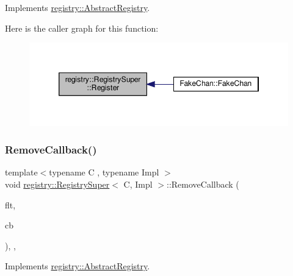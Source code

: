 Implements \hyperlink{classregistry_1_1AbstractRegistry_a5deafe61aa33b1be6b261d815e7397a1}{registry\+::\+Abstract\+Registry}.

Here is the caller graph for this function\+:
\nopagebreak
\begin{figure}[H]
\begin{center}
\leavevmode
\includegraphics[width=346pt]{classregistry_1_1RegistrySuper_a6293786807c1d9cc1f72a60c8c218b6f_icgraph}
\end{center}
\end{figure}
\mbox{\label{classregistry_1_1RegistrySuper_a61948ba29418a844f1b2c9b1259e26bf}} 
\subsubsection{\texorpdfstring{Remove\+Callback()}{RemoveCallback()}}
{\footnotesize\ttfamily template$<$typename C , typename Impl $>$ \\
void \hyperlink{classregistry_1_1RegistrySuper}{registry\+::\+Registry\+Super}$<$ C, Impl $>$\+::Remove\+Callback (\begin{DoxyParamCaption}\item[{\hyperlink{classregistry_1_1Filter}{Filter}}]{flt,  }\item[{\hyperlink{classregistry_1_1AbstractRegistry_a08a798ca9ca1c4c983ebd2386ca3c315}{Abstract\+Registry\+::\+Callback}}]{cb }\end{DoxyParamCaption})\hspace{0.3cm}{\ttfamily [override]}, {\ttfamily [virtual]}, {\ttfamily [noexcept]}}



Implements \hyperlink{classregistry_1_1AbstractRegistry_ae09a4b165d916b6c212988d882d1a33f}{registry\+::\+Abstract\+Registry}.

\mbox{\label{classregistry_1_1RegistrySuper_a3d35e055e1e69a00074701356e3e700f}} 
